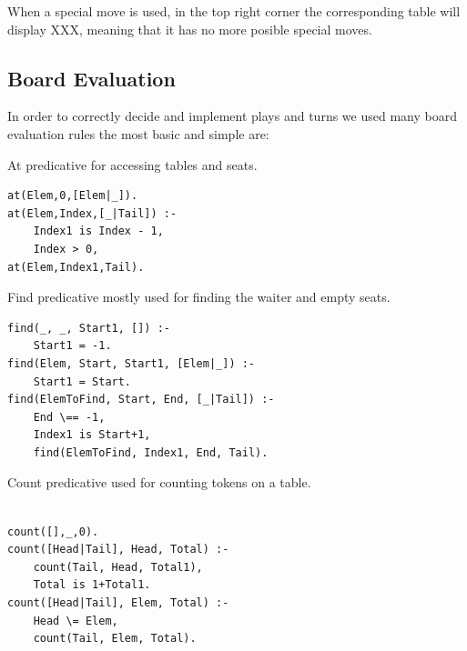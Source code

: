 \documentclass[a4paper]{article}
\begin{document}
When a special move is used, in the top right corner the corresponding table
 will display XXX, meaning that it has no more posible special moves.

\subsection{Board Evaluation}

In order to correctly decide and implement plays and turns we used many board evaluation rules the most basic and simple are:

        \begin{listing}[H]
            \caption{At predicative for accessing tables and seats.}
            \label{Codigo:cod_at}
            \begin{verbatim}
at(Elem,0,[Elem|_]).
at(Elem,Index,[_|Tail]) :-
    Index1 is Index - 1,
    Index > 0,
at(Elem,Index1,Tail).

    \end{verbatim}

    \end{listing}


        \begin{listing}[H]
        \caption{Find predicative mostly used for finding the waiter and empty seats.}
        \label{Codigo:cod_find}
        \begin{verbatim}
find(_, _, Start1, []) :-
    Start1 = -1.
find(Elem, Start, Start1, [Elem|_]) :-
    Start1 = Start.
find(ElemToFind, Start, End, [_|Tail]) :-
    End \== -1,
    Index1 is Start+1,
    find(ElemToFind, Index1, End, Tail).

        \end{verbatim}

        \end{listing}


        \begin{listing}[H]
        \caption{Count predicative used for counting tokens on a table.}
        \label{Codigo:cod_count}
        \begin{verbatim}

count([],_,0).
count([Head|Tail], Head, Total) :-
    count(Tail, Head, Total1),
    Total is 1+Total1.
count([Head|Tail], Elem, Total) :-
    Head \= Elem,
    count(Tail, Elem, Total).

        \end{verbatim}

        \end{listing}
\end{document}
